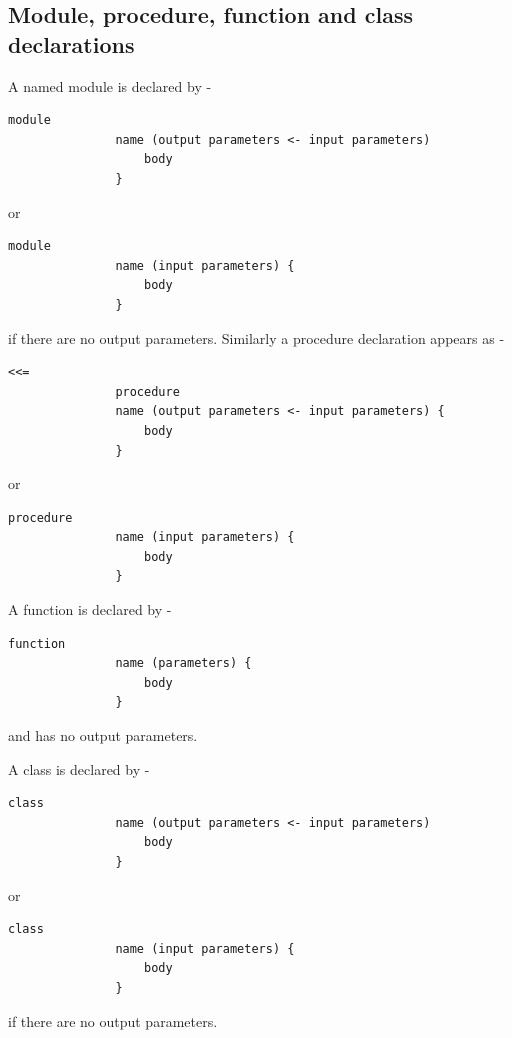         
        
        
        
        \subsection{Module, procedure, function and class declarations}\label{sec:mpfcdecl}
        
            A named module is declared by -
            \begin{lstlisting}[gobble=12, language=threepl]
               module
               name (output parameters <- input parameters) 
                   body
               }
            \end{lstlisting}
            or
            \begin{lstlisting}[gobble=12, language=threepl]
               module
               name (input parameters) {
                   body
               }
            \end{lstlisting}
            if there are no output parameters. Similarly a procedure
            declaration appears as -
            \begin{lstlisting}[gobble=12, language=threepl]<<=
               procedure
               name (output parameters <- input parameters) {
                   body
               }
            \end{lstlisting}
            or
            \begin{lstlisting}[gobble=12, language=threepl]
               procedure
               name (input parameters) {
                   body
               }
            \end{lstlisting}
            A function is declared by -
            \begin{lstlisting}[gobble=12, language=threepl]
               function
               name (parameters) {
                   body
               }
            \end{lstlisting}
            and has no output parameters.
            
            A class is declared by -
            \begin{lstlisting}[gobble=12, language=threepl]
               class
               name (output parameters <- input parameters) 
                   body
               }
            \end{lstlisting}
            or
            \begin{lstlisting}[gobble=12, language=threepl]
               class
               name (input parameters) {
                   body
               }
            \end{lstlisting}
            if there are no output parameters.
             
